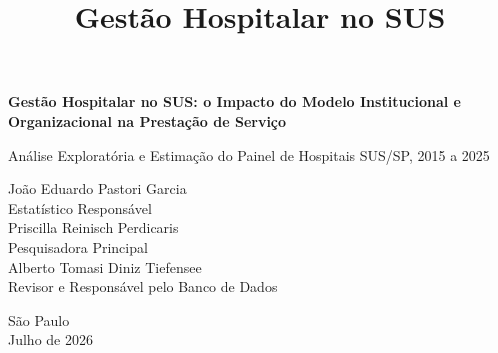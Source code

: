 \documentclass[12pt,a4paper]{article}
\title{Gestão Hospitalar no SUS}
\begin{document}
\begin{titlepage}
  \centering
  \vspace*{2.5cm}
  {\LARGE\bfseries Gestão Hospitalar no SUS: o Impacto do Modelo
   Institucional e Organizacional na Prestação de Serviço\par}
  \vspace{1.2cm}
  {\Large Análise Exploratória e Estimação do Painel de Hospitais
   SUS/SP, 2015 a 2025\par}
  \vspace{3.5cm}
  {\large
   João Eduardo Pastori Garcia\\
   {\normalsize Estatístico Responsável}\\[1.4em]
   Priscilla Reinisch Perdicaris\\
   {\normalsize Pesquisadora Principal}\\[1.4em]
   Alberto Tomasi Diniz Tiefensee\\
   {\normalsize Revisor e Responsável pelo Banco de Dados}\par}
  \vfill
  {\large São Paulo\\ Julho de 2026}
\end{titlepage}

\tableofcontents
\clearpage


\clearpage


\clearpage

\clearpage

\clearpage

\clearpage

\clearpage

\clearpage

\clearpage

\clearpage

\clearpage

\clearpage

\clearpage

\clearpage

\clearpage

\clearpage

\clearpage

\clearpage

\clearpage

\end{document}
